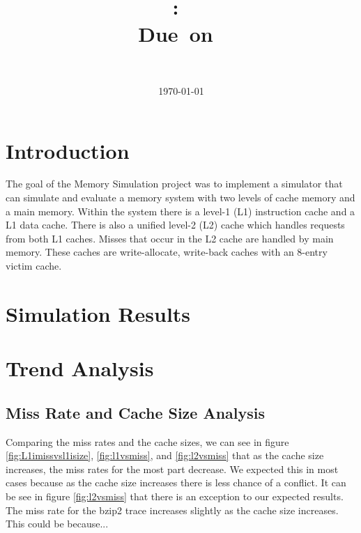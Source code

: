 \documentclass{article}
\title{
\vspace{2in}
\textmd{\textbf{\hmwkClass:\ \hmwkTitle}}\\
\normalsize\vspace{0.1in}\small{Due\ on\ \hmwkDueDate}\\
\vspace{3in}
}
\author{
\textbf{\hmwkAuthorName} \\
\hmwkAuthorNumber
}
\date{\today} %
\begin{document}
\maketitle



\newpage


\section{Introduction}

The goal of the Memory Simulation project was to implement a simulator that can simulate and evaluate a memory system with two levels of cache memory and a main memory. Within the system there is a level-1 (L1) instruction cache and a L1 data cache. There is also a unified level-2 (L2) cache which handles requests from both L1 caches. Misses that occur in the L2 cache are handled by main memory. These caches are write-allocate, write-back caches with an 8-entry victim cache. 

\section{Simulation Results}

\section{Trend Analysis}

\subsection{Miss Rate and Cache Size Analysis}

Comparing the miss rates and the cache sizes, we can see in figure \ref{fig:L1imissvsl1isize}, \ref{fig:l1vsmiss}, and \ref{fig:l2vsmiss} that as the cache size increases, the miss rates for the most part decrease. We expected this in most cases because as the cache size increases there is less chance of a conflict. It can be see in figure \ref{fig:l2vsmiss} that there is an exception to our expected results. The miss rate for the bzip2 trace increases slightly as the cache size increases. This could be because...
\end{document}
